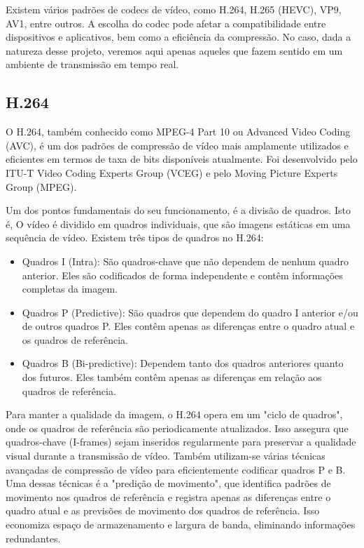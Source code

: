 \documentclass[12pt, %
openright, 
oneside, %
a4paper,    %
brazil]{facom-ufu-abntex2}
\begin{document}
Existem vários padrões de codecs de vídeo, como H.264, H.265 (HEVC), VP9, AV1,
entre outros. A escolha do codec pode afetar a compatibilidade entre
dispositivos e aplicativos, bem como a eficiência da compressão. No caso, dada
a natureza desse projeto, veremos aqui apenas aqueles que fazem sentido em um
ambiente de transmissão em tempo real.

\subsection{H.264}

O H.264, também conhecido como MPEG-4 Part 10 ou Advanced Video Coding (AVC), é
um dos padrões de compressão de vídeo mais amplamente utilizados e eficientes
em termos de taxa de bits disponíveis atualmente. Foi desenvolvido pelo ITU-T
Video Coding Experts Group (VCEG) e pelo Moving Picture Experts Group (MPEG).

Um dos pontos fundamentais do seu funcionamento, é a divisão de quadros. Isto
é, O vídeo é dividido em quadros individuais, que são imagens estáticas em uma
sequência de vídeo. Existem três tipos de quadros no H.264:

\begin{itemize}
	\item Quadros I (Intra): São quadros-chave que não dependem de nenhum
	      quadro anterior. Eles são codificados de forma independente e contêm
	      informações completas da imagem.
	\item Quadros P (Predictive): São quadros que dependem do quadro I
	      anterior e/ou de outros quadros P. Eles contêm apenas as diferenças entre o
	      quadro atual e os quadros de referência.
	\item Quadros B (Bi-predictive): Dependem tanto dos quadros anteriores
	      quanto dos futuros. Eles também contêm apenas as diferenças em relação aos
	      quadros de referência.
\end{itemize}

Para manter a qualidade da imagem, o H.264 opera em um "ciclo de quadros", onde
os quadros de referência são periodicamente atualizados. Isso assegura que
quadros-chave (I-frames) sejam inseridos regularmente para preservar a
qualidade visual durante a transmissão de vídeo. Também utilizam-se várias
técnicas avançadas de compressão de vídeo para eficientemente codificar quadros
P e B. Uma dessas técnicas é a "predição de movimento", que identifica padrões
de movimento nos quadros de referência e registra apenas as diferenças entre o
quadro atual e as previsões de movimento dos quadros de referência. Isso
economiza espaço de armazenamento e largura de banda, eliminando informações
redundantes.
\end{document}
